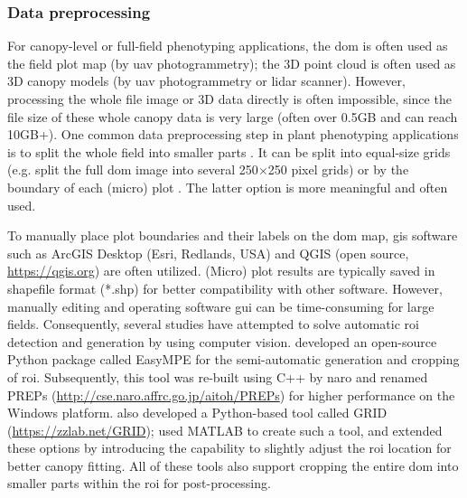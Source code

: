 \subsubsection{Data preprocessing} \label{sec:prepro}

For canopy-level or full-field phenotyping applications, the \gls{dom} is often used as the field plot map (by \gls{uav} photogrammetry); the 3D point cloud is often used as 3D canopy models (by \gls{uav} photogrammetry or \gls{lidar} scanner). However, processing the whole file image or 3D data directly is often impossible, since the file size of these whole canopy data is very large (often over 0.5GB and can reach 10GB+). One common data preprocessing step in plant phenotyping applications is to split the whole field into smaller parts \citep{wang_easyidp_2021}. It can be split into equal-size grids (e.g. \citet{bauer_combining_2019} split the full \gls{dom} image into several 250$\times$250 pixel grids) or by the boundary of each (micro) plot \citep{tresch_easympe_2019}. The latter option is more meaningful and often used.

To manually place plot boundaries and their labels on the \gls{dom} map, \gls{gis} software such as ArcGIS Desktop (Esri, Redlands, USA) and QGIS (open source, \url{https://qgis.org}) are often utilized. (Micro) plot results are typically saved in shapefile format (*.shp) for better compatibility with other software. However, manually editing and operating software \gls{gui} can be time-consuming for large fields. Consequently, several studies have attempted to solve automatic \gls{roi} detection and generation by using computer vision. \citep{tresch_easympe_2019} developed an open-source Python package called EasyMPE for the semi-automatic generation and cropping of \gls{roi}. Subsequently, this tool was re-built using C++ by \gls{naro} and renamed PREPs (\url{http://cse.naro.affrc.go.jp/aitoh/PREPs}) for higher performance on the Windows platform. \citet{chen_grid_2020} also developed a Python-based tool called GRID (\url{https://zzlab.net/GRID}); \citet{mortensen_drone_2019} used MATLAB to create such a tool, and \citep{sara_automatic_2021} extended these options by introducing the capability to slightly adjust the \gls{roi} location for better canopy fitting. All of these tools also support cropping the entire \gls{dom} into smaller parts within the \gls{roi} for post-processing.


